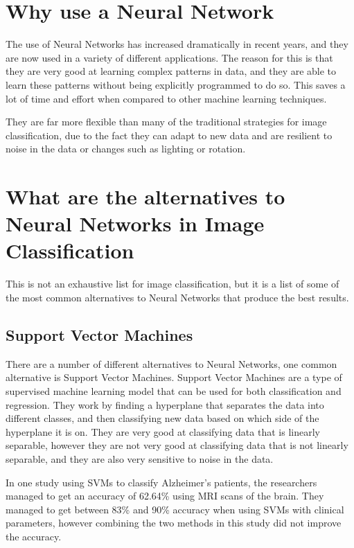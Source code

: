 \documentclass[]{final_report}
\begin{document}
\section{Why use a Neural Network}
The use of Neural Networks has increased dramatically in recent years, and they are now used in a variety of different applications.
The reason for this is that they are very good at learning complex patterns in data, and they are able to learn 
these patterns without being explicitly programmed to do so. This saves a lot of time and effort when compared to other machine learning techniques.

They are far more flexible than many of the traditional strategies for image classification, due to the fact they can adapt to new data and are
resilient to noise in the data or changes such as lighting or rotation.

\pagebreak
\section{What are the alternatives to Neural Networks in Image Classification}

This is not an exhaustive list for image classification, but it is a list of some of the most common alternatives to Neural Networks
that produce the best results.

\subsection{Support Vector Machines}
There are a number of different alternatives to Neural Networks, one common alternative is Support Vector Machines.
Support Vector Machines are a type of supervised machine learning model that can be used for both classification and regression.
They work by finding a hyperplane that separates the data into different classes, and then classifying new data based on which side of the hyperplane it is on.
They are very good at classifying data that is linearly separable, however they are not very good at classifying data that is not linearly separable,
and they are also very sensitive to noise in the data.

In one study using SVMs to classify Alzheimer's patients, the researchers managed to get an accuracy of 62.64\% using MRI scans of the brain.
They managed to get between 83\% and 90\% accuracy when using SVMs with clinical parameters, however combining the two methods in this study did not improve the accuracy. \cite{10.3389/fneur.2021.640696}
\end{document}
